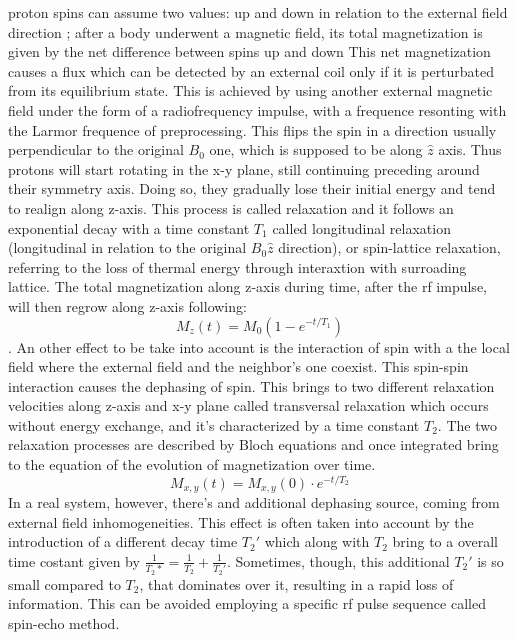 \documentclass[a4paper,11pt]{article}
\begin{document}
proton spins can assume two values: up and down in relation to the external field direction ; after a body  underwent a magnetic field, its total magnetization is given by the net difference between spins up and down
This net magnetization causes a flux which can be detected by an external coil only if it is perturbated from its equilibrium state. This is achieved by using another external magnetic field under the form of a radiofrequency impulse, with a frequence resonting with the Larmor frequence of preprocessing. This flips the spin in a direction usually perpendicular to the original $B_0$ one, which is supposed to be along $\hat z$ axis. Thus protons will start rotating in the x-y plane, still continuing preceding around their symmetry axis.
Doing so, they gradually lose their initial energy and tend to realign along z-axis.
This process is called relaxation and it follows an exponential decay with a time constant $T_1$ called longitudinal relaxation (longitudinal in relation to the original $B_0 \hat z$ direction), or spin-lattice relaxation, referring to the loss of thermal energy through interaxtion with surroading lattice. The total magnetization along z-axis during time, after the rf impulse, will then regrow along z-axis following:
\begin{equation}
M_z(t) = M_0 (1-e^{-t/T_1})
\end{equation}.
An other effect to be take into account is the interaction of spin with a the local field where the external field and the neighbor's one coexist. This spin-spin interaction causes the dephasing of spin. This brings to two different relaxation velocities along z-axis and x-y plane called transversal relaxation which occurs without energy exchange, and it's characterized by a time constant $T_2$. The two relaxation processes are described by Bloch equations and once integrated bring to the equation of the evolution of magnetization over time.
\begin{equation}
M_{x, y}(t) = M_{x,y}(0)\cdot e^{-t/T_2}
\end{equation}
In a real system, however, there's and additional dephasing source, coming from external field inhomogeneities.
This effect is often taken into account by the introduction of a different decay time $T_2'$ which along with $T_2$ bring to a overall time costant given by $\frac{1}{T_2*} = \frac{1}{T_2}+\frac{1}{T_2'}$.
Sometimes, though, this additional $T_2'$ is so small compared to $T_2$, that dominates over it, resulting in a rapid loss of information.
This can be avoided employing a specific rf pulse sequence called spin-echo method.
\end{document}
